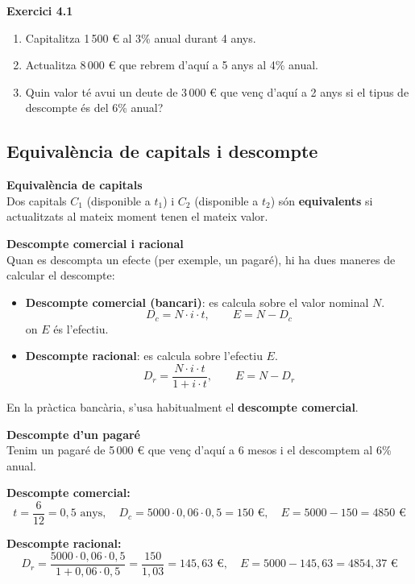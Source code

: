 \documentclass[12pt]{article}
\begin{document}
\begin{exercici}
\textbf{Exercici 4.1}\\
\begin{enumerate}[label=\alph*)]
    \item Capitalitza 1\,500 € al 3\% anual durant 4 anys.
    \item Actualitza 8\,000 € que rebrem d'aquí a 5 anys al 4\% anual.
    \item Quin valor té avui un deute de 3\,000 € que venç d'aquí a 2 anys si el tipus de descompte és del 6\% anual?
\end{enumerate}
\end{exercici}

\subsection{Equivalència de capitals i descompte}

\begin{concept}
\textbf{Equivalència de capitals}\\
Dos capitals $C_1$ (disponible a $t_1$) i $C_2$ (disponible a $t_2$) són \textbf{equivalents} si actualitzats al mateix moment tenen el mateix valor.

\textbf{Descompte comercial i racional}\\
Quan es descompta un efecte (per exemple, un pagaré), hi ha dues maneres de calcular el descompte:
\begin{itemize}
    \item \textbf{Descompte comercial (bancari)}: es calcula sobre el valor nominal $N$.
    \[
    D_c = N \cdot i \cdot t, \qquad E = N - D_c
    \]
    on $E$ és l'efectiu.
    \item \textbf{Descompte racional}: es calcula sobre l'efectiu $E$.
    \[
    D_r = \dfrac{N \cdot i \cdot t}{1 + i \cdot t}, \qquad E = N - D_r
    \]
\end{itemize}
En la pràctica bancària, s'usa habitualment el \textbf{descompte comercial}.
\end{concept}

\begin{exemple}
\textbf{Descompte d'un pagaré}\\
Tenim un pagaré de 5\,000 € que venç d'aquí a 6 mesos i el descomptem al 6\% anual.

\textbf{Descompte comercial:}
\[
t = \dfrac{6}{12} = 0{,}5 \text{ anys}, \quad
D_c = 5000 \cdot 0{,}06 \cdot 0{,}5 = 150 \text{ €}, \quad
E = 5000 - 150 = 4850 \text{ €}
\]

\textbf{Descompte racional:}
\[
D_r = \dfrac{5000 \cdot 0{,}06 \cdot 0{,}5}{1 + 0{,}06 \cdot 0{,}5} = \dfrac{150}{1{,}03} = 145{,}63 \text{ €}, \quad
E = 5000 - 145{,}63 = 4854{,}37 \text{ €}
\]
\end{exemple}
\end{document}
